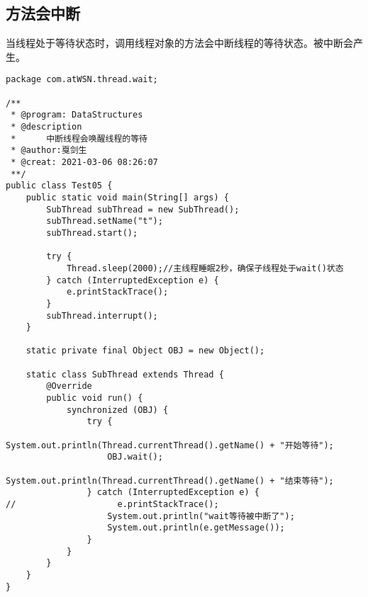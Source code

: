 \documentclass[a4paper]{report}
\begin{document}
\subsection{方法会中断}
当线程处于等待状态时，调用线程对象的方法会中断线程的等待状态。被中断会产生。

\begin{Verbatim}[frame=single,numbersep=5pt,xleftmargin=1.5em,xrightmargin=1.5em]
package com.atWSN.thread.wait;

/**
 * @program: DataStructures
 * @description
 *      中断线程会唤醒线程的等待
 * @author:戛剑生
 * @creat: 2021-03-06 08:26:07
 **/
public class Test05 {
    public static void main(String[] args) {
        SubThread subThread = new SubThread();
        subThread.setName("t");
        subThread.start();

        try {
            Thread.sleep(2000);//主线程睡眠2秒，确保子线程处于wait()状态
        } catch (InterruptedException e) {
            e.printStackTrace();
        }
        subThread.interrupt();
    }

    static private final Object OBJ = new Object();

    static class SubThread extends Thread {
        @Override
        public void run() {
            synchronized (OBJ) {
                try {
                    System.out.println(Thread.currentThread().getName() + "开始等待");
                    OBJ.wait();
                    System.out.println(Thread.currentThread().getName() + "结束等待");
                } catch (InterruptedException e) {
//                    e.printStackTrace();
                    System.out.println("wait等待被中断了");
                    System.out.println(e.getMessage());
                }
            }
        }
    }
}\end{Verbatim}
\end{document}
